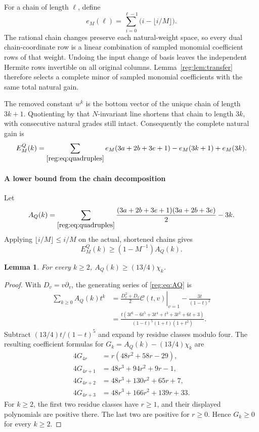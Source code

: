 \documentclass[11pt]{amsart}
\newtheorem{lemma}[theorem]{Lemma}
\theoremstyle{definition}
\theoremstyle{remark}
\numberwithin{equation}{section}
\begin{document}
For a chain of length $\ell$, define
\[
e_M(\ell)=\sum_{i=0}^{\ell-1}\bigl(i-\lfloor i/M\rfloor\bigr).
\]
The rational chain changes preserve each natural-weight space, so every dual chain-coordinate row is a linear combination of sampled monomial coefficient rows of that weight. Undoing the input change of basis leaves the independent Hermite rows invertible on all original columns. Lemma~\ref{reg:lem:transfer} therefore selects a complete minor of sampled monomial coefficients with the same total natural gain.

The removed constant $w^k$ is the bottom vector of the unique chain of length $3k+1$. Quotienting by that $N$-invariant line shortens that chain to length $3k$, with consecutive natural grades still intact. Consequently the complete natural gain is
\begin{equation}\label{reg:eq:EQ}
E^Q_M(k)=\sum_{\eqref{reg:eq:quadruples}}e_M(3a+2b+3e+1)-e_M(3k+1)+e_M(3k).
\end{equation}

\paragraph{A lower bound from the chain decomposition}
Let
\begin{equation}\label{reg:eq:AQ}
A_Q(k)=\sum_{\eqref{reg:eq:quadruples}}\frac{(3a+2b+3e+1)(3a+2b+3e)}2-3k.
\end{equation}
Applying $\lfloor i/M\rfloor\le i/M$ on the actual, shortened chains gives
\begin{equation}\label{reg:eq:EQbound}
E^Q_M(k)\ge(1-M^{-1})A_Q(k).
\end{equation}

\begin{lemma}\label{reg:lem:AQ}
For every $k\ge2$, $A_Q(k)\ge(13/4)\chi_k$.
\end{lemma}
\begin{proof}
With $D_v=v\partial_v$, the generating series of \eqref{reg:eq:AQ} is
\[
\begin{aligned}
 \sum_{k\ge0}A_Q(k)t^k&=\left.\frac{D_v^2+D_v}{2}\mathcal C(t,v)\right|_{v=1}-\frac{3t}{(1-t)^2}\\
 &=\frac{t(3t^6-6t^5+3t^4+t^3+3t^2+6t+3)}{(1-t)^5(1+t)(1+t^2)}.
\end{aligned}
\]
Subtract $(13/4)t/(1-t)^5$ and expand by residue classes modulo four. The resulting coefficient formulas for $G_k=A_Q(k)-(13/4)\chi_k$ are
\begin{equation}\label{reg:eq:Qgap}
\begin{aligned}
 4G_{4r}&=r(48r^2+58r-29),\\
 4G_{4r+1}&=48r^3+94r^2+9r-1,\\
 4G_{4r+2}&=48r^3+130r^2+65r+7,\\
 4G_{4r+3}&=48r^3+166r^2+139r+33.
\end{aligned}
\end{equation}
For $k\ge2$, the first two residue classes have $r\ge1$, and their displayed polynomials are positive there. The last two are positive for $r\ge0$. Hence $G_k\ge0$ for every $k\ge2$.
\end{proof}
\end{document}
